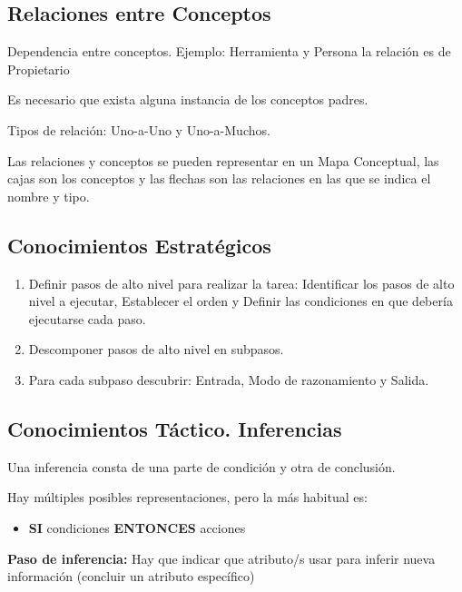 \documentclass[12pt, twoside, openright]{report} %
\begin{document}
\subsection{Relaciones entre Conceptos}
Dependencia entre conceptos. Ejemplo: Herramienta y Persona la relación es de Propietario

Es necesario que exista alguna instancia de los conceptos padres.

Tipos de relación: Uno-a-Uno y Uno-a-Muchos.

Las relaciones y conceptos se pueden representar en un Mapa Conceptual, las cajas son los conceptos y las flechas son las relaciones en las que se indica el nombre y tipo.
\pagebreak

\subsection{Conocimientos Estratégicos}
\begin{enumerate}
	\item Definir pasos de alto nivel para realizar la tarea: Identificar los pasos de alto nivel a ejecutar, Establecer el orden y Definir las condiciones en que debería ejecutarse cada paso.
	\item Descomponer pasos de alto nivel en subpasos.
	\item Para cada subpaso descubrir: Entrada, Modo de razonamiento y Salida.
\end{enumerate}

\subsection{Conocimientos Táctico. Inferencias}
Una inferencia consta de una parte de condición y otra de conclusión.

Hay múltiples posibles representaciones, pero la más habitual es: 
\begin{itemize}
	\item \textbf{SI} condiciones \textbf{ENTONCES} acciones
\end{itemize}

\textbf{Paso de inferencia:} Hay que indicar que atributo/s usar para inferir nueva información (concluir un atributo específico)
\end{document}
